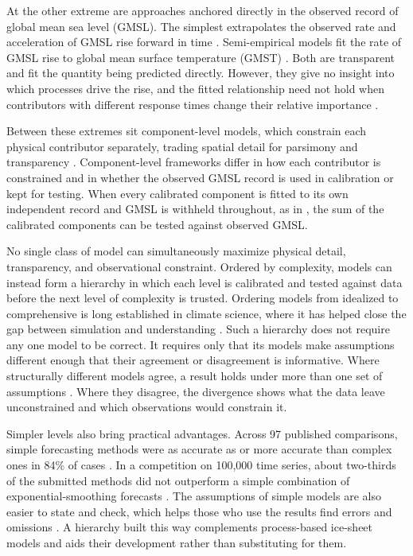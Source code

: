 \documentclass[draft,linenumbers]{agujournal2025}
\begin{document}
At the other extreme are approaches anchored directly in the observed record of global mean sea level (GMSL). The simplest extrapolates the observed rate and acceleration of GMSL rise forward in time \citep{Nerem2022}. Semi-empirical models fit the rate of GMSL rise to global mean surface temperature (GMST) \citep{Rahmstorf2007,Vermeer2009,Rahmstorf2012,Kopp2016}. Both are transparent and fit the quantity being predicted directly. However, they give no insight into which processes drive the rise, and the fitted relationship need not hold when contributors with different response times change their relative importance \citep{Church2013}.

Between these extremes sit component-level models, which constrain each physical contributor separately, trading spatial detail for parsimony and transparency \citep{Perrette2013,Kopp2014,Mengel2016,Nauels2017,Wong2017,Kopp2023}. Component-level frameworks differ in how each contributor is constrained and in whether the observed GMSL record is used in calibration or kept for testing. When every calibrated component is fitted to its own independent record and GMSL is withheld throughout, as in \citet{Mengel2016}, the sum of the calibrated components can be tested against observed GMSL.

No single class of model can simultaneously maximize physical detail, transparency, and observational constraint. Ordered by complexity, models can instead form a hierarchy in which each level is calibrated and tested against data before the next level of complexity is trusted. Ordering models from idealized to comprehensive is long established in climate science, where it has helped close the gap between simulation and understanding \citep{Held2005,Jeevanjee2017,Maher2019}. Such a hierarchy does not require any one model to be correct. It requires only that its models make assumptions different enough that their agreement or disagreement is informative. Where structurally different models agree, a result holds under more than one set of assumptions \citep{Lipscomb2025}. Where they disagree, the divergence shows what the data leave unconstrained and which observations would constrain it.

Simpler levels also bring practical advantages. Across 97 published comparisons, simple forecasting methods were as accurate as or more accurate than complex ones in 84\% of cases \citep{Green2015}. In a competition on 100,000 time series, about two-thirds of the submitted methods did not outperform a simple combination of exponential-smoothing forecasts \citep{Makridakis2020}. The assumptions of simple models are also easier to state and check, which helps those who use the results find errors and omissions \citep{Green2015}. A hierarchy built this way complements process-based ice-sheet models and aids their development rather than substituting for them.
\end{document}
